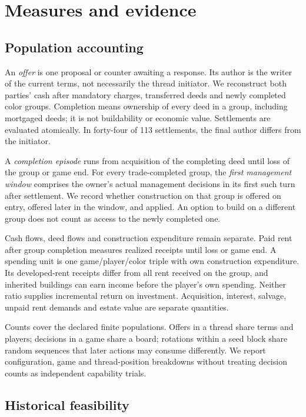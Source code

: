 \section{Measures and evidence}
\label{sec:methods}

\subsection{Population accounting}

An \emph{offer} is one proposal or counter awaiting a response. Its author is the writer of the current terms, not necessarily the thread initiator. We reconstruct both parties' cash after mandatory charges, transferred deeds and newly completed color groups. Completion means ownership of every deed in a group, including mortgaged deeds; it is not buildability or economic value. Settlements are evaluated atomically. In forty-four of 113 settlements, the final author differs from the initiator.

A \emph{completion episode} runs from acquisition of the completing deed until loss of the group or game end. For every trade-completed group, the \emph{first management window} comprises the owner's actual management decisions in its first such turn after settlement. We record whether construction on that group is offered on entry, offered later in the window, and applied. An option to build on a different group does not count as access to the newly completed one.

Cash flows, deed flows and construction expenditure remain separate. Paid rent after group completion measures realized receipts until loss or game end. A spending unit is one game/player/color triple with own construction expenditure. Its developed-rent receipts differ from all rent received on the group, and inherited buildings can earn income before the player's own spending. Neither ratio supplies incremental return on investment. Acquisition, interest, salvage, unpaid rent demands and estate value are separate quantities.

Counts cover the declared finite populations. Offers in a thread share terms and players; decisions in a game share a board; rotations within a seed block share random sequences that later actions may consume differently. We report configuration, game and thread-position breakdowns without treating decision counts as independent capability trials.

\subsection{Historical feasibility}

